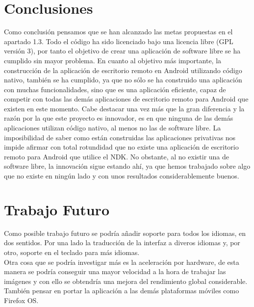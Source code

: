 \section{Conclusiones}
Como conclusión pensamos que se han alcanzado las metas propuestas en el apartado 1.3. Todo el código ha sido licenciado bajo una licencia libre (GPL versión 3), por tanto el objetivo de crear una aplicación de software libre se ha cumplido sin mayor problema. En cuanto al objetivo más importante, la construcción de la aplicación de escritorio remoto en Android utilizando código nativo, también se ha cumplido, ya que no sólo se ha construido una aplicación con muchas funcionalidades, sino que es una aplicación eficiente, capaz de competir con todas las demás aplicaciones de escritorio remoto para Android que existen en este momento. Cabe destacar una vez más que la gran diferencia y la razón por la que este proyecto es innovador, es en que ninguna de las demás aplicaciones utilizan código nativo, al menos no las de software libre. La imposibilidad de saber como están construidas las aplicaciones privativas nos impide afirmar con total rotundidad que no existe una aplicación de escritorio remoto para Android que utilice el NDK. No obstante, al no existir una de software libre, la innovación sigue estando ahí, ya que hemos trabajado sobre algo que no existe en ningún lado y con unos resultados considerablemente buenos.

\section{Trabajo Futuro}

Como posible trabajo futuro se podría añadir soporte para todos los idiomas, en dos sentidos. Por una lado la traducción de la interfaz a diveros idiomas y, por otro, soporte en el teclado para más idiomas.\\

Otra cosa que se podría investigar más es la aceleración por hardware, de esta manera se podría conseguir una mayor velocidad a la hora de trabajar las imágenes y con ello se obtendría una mejora del rendimiento global considerable.\\

También pensar en portar la aplicación a las demás plataformas móviles como Firefox OS. 
